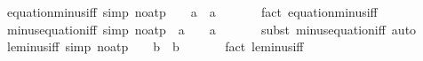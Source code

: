 \begin{isabellebody}
\begin{isamarkuptext}
\end{isamarkuptext}\isamarkuptrue%
\isamarkupfalse%
\ equation{\isacharunderscore}{\kern0pt}minus{\isacharunderscore}{\kern0pt}iff{\isacharunderscore}{\kern0pt}{}\ {\isacharbrackleft}{\kern0pt}simp{\isacharcomma}{\kern0pt}\ no{\isacharunderscore}{\kern0pt}atp{\isacharbrackright}{\kern0pt}{\isacharcolon}{\kern0pt}\ {\isachardoublequoteopen}{}\ {\isacharequal}{\kern0pt}\ {\isacharminus}{\kern0pt}\ a\ {\isasymlongleftrightarrow}\ a\ {\isacharequal}{\kern0pt}\ {\isacharminus}{\kern0pt}\ {}{\isachardoublequoteclose}\isanewline
%
\isadelimproof
\ \ %
\endisadelimproof
%
\isatagproof
{}\isamarkupfalse%
\ {\isacharparenleft}{\kern0pt}fact\ equation{\isacharunderscore}{\kern0pt}minus{\isacharunderscore}{\kern0pt}iff{\isacharparenright}{\kern0pt}%
\endisatagproof
{\isafoldproof}%
%
\isadelimproof
\isanewline
%
\endisadelimproof
\isanewline
{}\isamarkupfalse%
\ minus{\isacharunderscore}{\kern0pt}equation{\isacharunderscore}{\kern0pt}iff{\isacharunderscore}{\kern0pt}{}\ {\isacharbrackleft}{\kern0pt}simp{\isacharcomma}{\kern0pt}\ no{\isacharunderscore}{\kern0pt}atp{\isacharbrackright}{\kern0pt}{\isacharcolon}{\kern0pt}\ {\isachardoublequoteopen}{\isacharminus}{\kern0pt}\ a\ {\isacharequal}{\kern0pt}\ {}\ {\isasymlongleftrightarrow}\ a\ {\isacharequal}{\kern0pt}\ {\isacharminus}{\kern0pt}\ {}{\isachardoublequoteclose}\isanewline
%
\isadelimproof
\ \ %
\endisadelimproof
%
\isatagproof
{}\isamarkupfalse%
\ {\isacharparenleft}{\kern0pt}subst\ minus{\isacharunderscore}{\kern0pt}equation{\isacharunderscore}{\kern0pt}iff{\isacharcomma}{\kern0pt}\ auto{\isacharparenright}{\kern0pt}%
\endisatagproof
{\isafoldproof}%
%
\isadelimproof
\isanewline
%
\endisadelimproof
\isanewline
{}\isamarkupfalse%
\ le{\isacharunderscore}{\kern0pt}minus{\isacharunderscore}{\kern0pt}iff{\isacharunderscore}{\kern0pt}{}\ {\isacharbrackleft}{\kern0pt}simp{\isacharcomma}{\kern0pt}\ no{\isacharunderscore}{\kern0pt}atp{\isacharbrackright}{\kern0pt}{\isacharcolon}{\kern0pt}\ {\isachardoublequoteopen}{}\ {\isasymle}\ {\isacharminus}{\kern0pt}\ b\ {\isasymlongleftrightarrow}\ b\ {\isasymle}\ {\isacharminus}{\kern0pt}\ {}{\isachardoublequoteclose}\isanewline
%
\isadelimproof
\ \ %
\endisadelimproof
%
\isatagproof
{}\isamarkupfalse%
\ {\isacharparenleft}{\kern0pt}fact\ le{\isacharunderscore}{\kern0pt}minus{\isacharunderscore}{\kern0pt}iff{\isacharparenright}{\kern0pt}%
\endisatagproof

\end{isabellebody}
